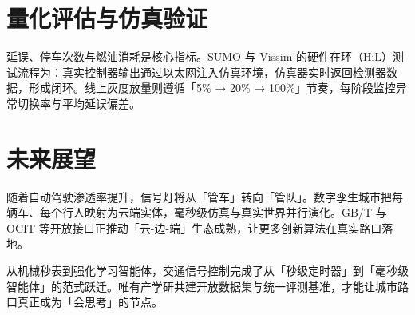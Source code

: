 \chapter{量化评估与仿真验证}
延误、停车次数与燃油消耗是核心指标。SUMO 与 Vissim 的硬件在环（HiL）测试流程为：真实控制器输出通过以太网注入仿真环境，仿真器实时返回检测器数据，形成闭环。线上灰度放量则遵循「5\%{} → 20\%{} → 100\%{}」节奏，每阶段监控异常切换率与平均延误偏差。\par
\chapter{未来展望}
随着自动驾驶渗透率提升，信号灯将从「管车」转向「管队」。数字孪生城市把每辆车、每个行人映射为云端实体，毫秒级仿真与真实世界并行演化。GB/T 与 OCIT 等开放接口正推动「云-边-端」生态成熟，让更多创新算法在真实路口落地。\par
从机械秒表到强化学习智能体，交通信号控制完成了从「秒级定时器」到「毫秒级智能体」的范式跃迁。唯有产学研共建开放数据集与统一评测基准，才能让城市路口真正成为「会思考」的节点。\par
